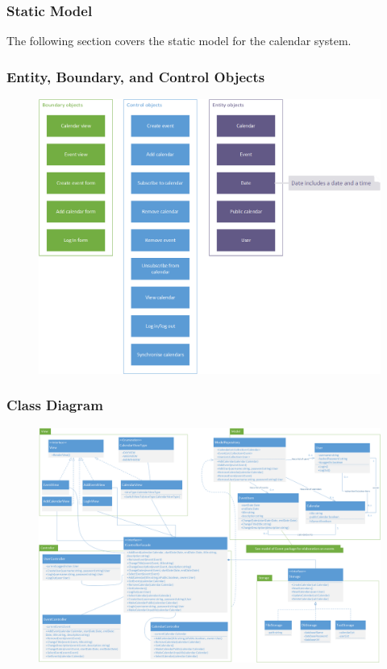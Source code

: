 \subsubsection{Static Model}
The following section covers the static model for the calendar system.

\subsubsection{Entity, Boundary, and Control Objects}
\begin{figure}[h]
\includegraphics[scale=0.8]{figures/entity-boundary-control.png}
\end{figure}

\subsubsection{Class Diagram}
\begin{figure}[h]
\includegraphics[scale=0.6]{figures/classdiagram.png}
\end{figure}
\clearpage